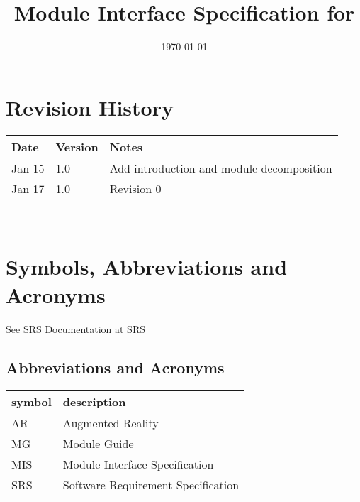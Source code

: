 \documentclass[12pt, titlepage]{article}
\begin{document}
\title{Module Interface Specification for \progname{}}

\author{\authname}

\date{\today}

\maketitle


\section{Revision History}

\begin{tabularx}{\textwidth}{p{3cm}p{2cm}X}
\toprule {\bf Date} & {\bf Version} & {\bf Notes}\\
\midrule
Jan 15 & 1.0 & Add introduction and module decomposition\\
Jan 17 & 1.0 & Revision 0\\
\bottomrule
\end{tabularx}

~\newpage

\section{Symbols, Abbreviations and Acronyms}

See SRS Documentation at \href{https://github.com/beatlepie/4G06CapstoneProjectTeam2/blob/main/docs/SRS-Volere/SRS.pdf}{SRS}
\subsection{Abbreviations and Acronyms}

\renewcommand{\arraystretch}{1.2}
\begin{tabular}{l l} 
  \toprule		
  \textbf{symbol} & \textbf{description}\\
  \midrule 
  AR & Augmented Reality\\
  MG & Module Guide \\
  MIS & Module Interface Specification \\
  SRS & Software Requirement Specification\\
  \bottomrule
\end{tabular}\\

\newpage

\tableofcontents

\newpage
\end{document}
